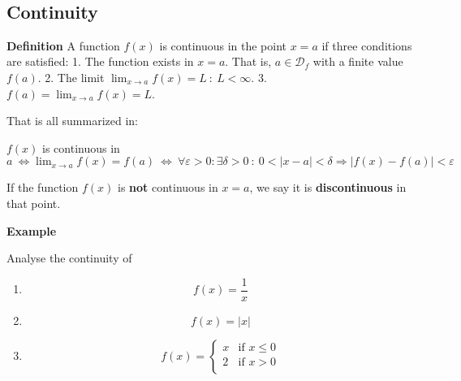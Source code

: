 \documentclass[11pt]{article}
\providecommand{\tightlist}{%
      \setlength{\itemsep}{0pt}\setlength{\parskip}{0pt}}
\begin{document}
    \begin{center}
    \end{center}
    { \hspace*{\fill} \\}
    
    \hypertarget{continuity}{%
\subsection{Continuity}\label{continuity}}

\textbf{Definition} A function \(f(x)\) is continuous in the point
\(x = a\) if three conditions are satisfied: 1. The function exists in
\(x = a\). That is, \(a\in\mathcal{D}_{f}\) with a finite value
\(f(a)\). 2. The limit
\(\lim_{x\rightarrow a} f(x) = L \ : \ L < \infty\). 3.
\(f(a) = \lim_{x\rightarrow a} f(x) = L\).

That is all summarized in:

\(f(x)\) is continuous in
\(a \ \iff \lim_{x\rightarrow a}f(x) = f(a) \ \iff \ \forall \varepsilon > 0 : \exists\delta> 0 \ : \ 0 < \lvert x-a \rvert < \delta \Rightarrow \lvert f(x)-f(a)\rvert < \varepsilon\)

If the function \(f(x)\) is \textbf{not} continuous in \(x = a\), we say
it is \textbf{discontinuous} in that point.

\textbf{Example}

Analyse the continuity of

\begin{enumerate}
\def\labelenumi{\arabic{enumi}.}
\tightlist
\item
  \[
  f(x) = \frac{1}{x}
  \]
\item
  \[
  f(x) = \lvert x \rvert
  \]
\item
  \[
  f(x) = \begin{cases}
  x & \text{if } x \leq 0 \\
  2 & \text{if } x > 0 \\
  \end{cases}
  \]
\end{enumerate}
\end{document}
